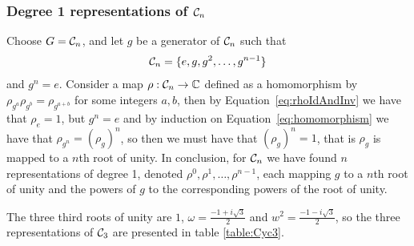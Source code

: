 \subsubsection{Degree 1 representations of $\mathcal{C}_n$}\label{sect:deg1cycn}

Choose $G = \mathcal{C}_n$, and let $g$ be a generator of $\mathcal{C}_n$ such that 
\begin{align*}
	\mathcal{C}_n = \{ e, g, g^2, \dots, g^{n-1}\}
\end{align*}
and $g^n = e$. Consider a map $\rho: \mathcal{C}_n \rightarrow \mathbb{C}$ defined as a homomorphism by $\rho_{g^a}\rho_{g^b} = \rho_{g^{a+b}}$ for some integers $a,b$, then by Equation~\ref{eq:rhoIdAndInv} we have that $\rho_e = 1$, but $g^n = e$ and by induction on Equation~\ref{eq:homomorphism} we have that $\rho_{g^n} = (\rho_g)^n$, so then we must have that $(\rho_g)^n = 1$, that is $\rho_g$ is mapped to a $n$th root of unity.
In conclusion, for $\mathcal{C}_n$ we have found $n$ representations of degree 1, denoted $\rho^0, \rho^1, \dots, \rho^{n-1}$, each mapping $g$ to a $n$th root of unity and the powers of $g$ to the corresponding powers of the root of unity. 

\begin{example}[$\Cyc_3$]
	The three third roots of unity are $1$, $\omega = \frac{-1+i\sqrt{3}}{2}$ and $w^2 = \frac{-1-i\sqrt{3}}{2}$, so the three representations of $\Cyc_3$ are presented in table \ref{table:Cyc3}. %
	
\end{example}

